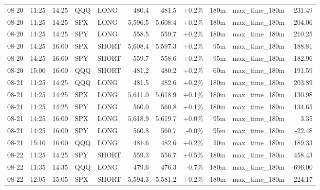 \documentclass[11pt,a4paper,twoside]{article}
\begin{document}
\begin{center}
\begin{longtable}{>{\color{txtmain}}l l l l l r r r r >{\color{txtmain}}l r}
08-20 & 11:25 & 14:25 & QQQ & LONG & 480.4 & 481.5 & \textcolor{wingreen}{+0.2\%} & 180m & max\_time\_180m & \textcolor{wingreen}{231.49} \\
08-20 & 11:25 & 14:25 & SPX & LONG & 5,596.5 & 5,608.4 & \textcolor{wingreen}{+0.2\%} & 180m & max\_time\_180m & \textcolor{wingreen}{204.06} \\
08-20 & 11:25 & 14:25 & SPY & LONG & 558.5 & 559.7 & \textcolor{wingreen}{+0.2\%} & 180m & max\_time\_180m & \textcolor{wingreen}{210.25} \\
08-20 & 14:25 & 16:00 & SPX & SHORT & 5,608.4 & 5,597.3 & \textcolor{wingreen}{+0.2\%} & 95m & max\_time\_180m & \textcolor{wingreen}{188.81} \\
08-20 & 14:25 & 16:00 & SPY & SHORT & 559.7 & 558.6 & \textcolor{wingreen}{+0.2\%} & 95m & max\_time\_180m & \textcolor{wingreen}{182.96} \\
08-20 & 15:00 & 16:00 & QQQ & SHORT & 481.2 & 480.2 & \textcolor{wingreen}{+0.2\%} & 60m & max\_time\_180m & \textcolor{wingreen}{191.59} \\
08-21 & 11:25 & 14:25 & QQQ & LONG & 481.5 & 482.6 & \textcolor{wingreen}{+0.2\%} & 180m & max\_time\_180m & \textcolor{wingreen}{203.89} \\
08-21 & 11:25 & 14:25 & SPX & LONG & 5,611.0 & 5,618.9 & \textcolor{wingreen}{+0.1\%} & 180m & max\_time\_180m & \textcolor{wingreen}{130.98} \\
08-21 & 11:25 & 14:25 & SPY & LONG & 560.0 & 560.8 & \textcolor{wingreen}{+0.1\%} & 180m & max\_time\_180m & \textcolor{wingreen}{134.65} \\
08-21 & 14:25 & 16:00 & SPX & LONG & 5,618.9 & 5,619.7 & \textcolor{wingreen}{+0.0\%} & 95m & max\_time\_180m & \textcolor{wingreen}{3.35} \\
08-21 & 14:25 & 16:00 & SPY & LONG & 560.8 & 560.7 & \textcolor{lossred}{-0.0\%} & 95m & max\_time\_180m & \textcolor{lossred}{-22.48} \\
08-21 & 15:10 & 16:00 & QQQ & LONG & 481.6 & 482.6 & \textcolor{wingreen}{+0.2\%} & 50m & max\_time\_180m & \textcolor{wingreen}{189.33} \\
08-22 & 11:25 & 14:25 & SPY & SHORT & 559.3 & 556.7 & \textcolor{wingreen}{+0.5\%} & 180m & max\_time\_180m & \textcolor{wingreen}{458.43} \\
08-22 & 11:35 & 14:35 & QQQ & LONG & 479.6 & 476.3 & \textcolor{lossred}{-0.7\%} & 180m & max\_time\_180m & \textcolor{lossred}{-696.00} \\
08-22 & 12:05 & 15:05 & SPX & SHORT & 5,594.3 & 5,581.2 & \textcolor{wingreen}{+0.2\%} & 180m & max\_time\_180m & \textcolor{wingreen}{224.17} \\

\end{longtable}
\end{center}
\end{document}
